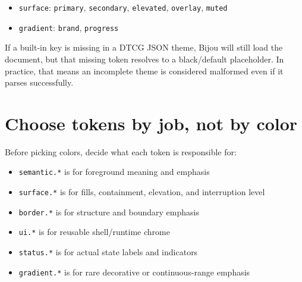 \begin{itemize}
\item
  \texttt{s\allowbreak{}u\allowbreak{}r\allowbreak{}f\allowbreak{}a\allowbreak{}c\allowbreak{}e}: \texttt{p\allowbreak{}r\allowbreak{}i\allowbreak{}m\allowbreak{}a\allowbreak{}r\allowbreak{}y}, \texttt{s\allowbreak{}e\allowbreak{}c\allowbreak{}o\allowbreak{}n\allowbreak{}d\allowbreak{}a\allowbreak{}r\allowbreak{}y}, \texttt{e\allowbreak{}l\allowbreak{}e\allowbreak{}v\allowbreak{}a\allowbreak{}t\allowbreak{}e\allowbreak{}d}, \texttt{o\allowbreak{}v\allowbreak{}e\allowbreak{}r\allowbreak{}l\allowbreak{}a\allowbreak{}y}, \texttt{m\allowbreak{}u\allowbreak{}t\allowbreak{}e\allowbreak{}d}
\item
  \texttt{g\allowbreak{}r\allowbreak{}a\allowbreak{}d\allowbreak{}i\allowbreak{}e\allowbreak{}n\allowbreak{}t}: \texttt{b\allowbreak{}r\allowbreak{}a\allowbreak{}n\allowbreak{}d}, \texttt{p\allowbreak{}r\allowbreak{}o\allowbreak{}g\allowbreak{}r\allowbreak{}e\allowbreak{}s\allowbreak{}s}
\end{itemize}

If a built-in key is missing in a DTCG JSON theme, Bijou will still load the document, but that missing token resolves to a black/default placeholder. In practice, that means an incomplete theme is considered malformed even if it parses successfully.

\section{Choose tokens by job, not by color}\label{record-026-choose-tokens-by-job-not-by-color}

Before picking colors, decide what each token is responsible for:

\begin{itemize}
\tightlist
\item
  \texttt{s\allowbreak{}e\allowbreak{}m\allowbreak{}a\allowbreak{}n\allowbreak{}t\allowbreak{}i\allowbreak{}c\allowbreak{}.\allowbreak{}*} is for foreground meaning and emphasis
\item
  \texttt{s\allowbreak{}u\allowbreak{}r\allowbreak{}f\allowbreak{}a\allowbreak{}c\allowbreak{}e\allowbreak{}.\allowbreak{}*} is for fills, containment, elevation, and interruption level
\item
  \texttt{b\allowbreak{}o\allowbreak{}r\allowbreak{}d\allowbreak{}e\allowbreak{}r\allowbreak{}.\allowbreak{}*} is for structure and boundary emphasis
\item
  \texttt{u\allowbreak{}i\allowbreak{}.\allowbreak{}*} is for reusable shell/runtime chrome
\item
  \texttt{s\allowbreak{}t\allowbreak{}a\allowbreak{}t\allowbreak{}u\allowbreak{}s\allowbreak{}.\allowbreak{}*} is for actual state labels and indicators
\item
  \texttt{g\allowbreak{}r\allowbreak{}a\allowbreak{}d\allowbreak{}i\allowbreak{}e\allowbreak{}n\allowbreak{}t\allowbreak{}.\allowbreak{}*} is for rare decorative or continuous-range emphasis
\end{itemize}

